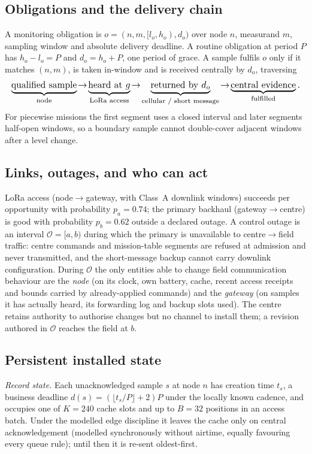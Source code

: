 \documentclass[journal,10pt]{IEEEtran}
\begin{document}
\subsection{Obligations and the delivery chain}
A monitoring obligation is $o=(n,m,[l_o,h_o),d_o)$ over node $n$, measurand $m$, sampling window
and absolute delivery deadline. A routine obligation at period $P$ has $h_o-l_o=P$ and
$d_o=h_o+P$, one period of grace. A sample fulfils $o$ only if it matches $(n,m)$, is taken
in-window and is received centrally by $d_o$, traversing
\begin{equation}
\resizebox{\columnwidth}{!}{$\displaystyle
\underbrace{\text{qualified sample}}_{\text{node}}
 \!\to\! \underbrace{\text{heard at }g}_{\text{LoRa access}}
 \!\to\! \underbrace{\text{returned by }d_o}_{\text{cellular / short message}}
 \!\to\! \underbrace{\text{central evidence}}_{\text{fulfilled}} .$}
\end{equation}
For piecewise missions the first segment uses a closed interval and later segments half-open
windows, so a boundary sample cannot double-cover adjacent windows after a level change.

\subsection{Links, outages, and who can act}
LoRa access (node$\to$gateway, with Class~A downlink windows) succeeds per opportunity with
probability $p_a{=}0.74$; the primary backhaul (gateway$\to$centre) is good with probability
$p_b{=}0.62$ outside a declared outage. A control outage is an interval $\mathcal O=[a,b)$ during
which the primary is unavailable to centre$\to$field traffic: centre commands and mission-table
segments are refused at admission and never transmitted, and the short-message backup cannot
carry downlink configuration. During $\mathcal O$ the only entities able to change field
communication behaviour are the \emph{node} (on its clock, own battery, cache, recent access
receipts and bounds carried by already-applied commands) and the \emph{gateway} (on samples it
has actually heard, its forwarding log and backup slots used). The centre retains authority to
authorise changes but no channel to install them; a revision authored in $\mathcal O$ reaches the
field at $b$.

\subsection{Persistent installed state}
\emph{Record state.} Each unacknowledged sample $s$ at node $n$ has creation time $t_s$, a
business deadline $d(s)=(\lfloor t_s/P\rfloor+2)P$ under the locally known cadence, and occupies
one of $K{=}240$ cache slots and up to $B{=}32$ positions in an access batch. Under the modelled
edge discipline it leaves the cache only on central acknowledgement (modelled synchronously
without airtime, equally favouring every queue rule); until then it is re-sent oldest-first.
\end{document}
